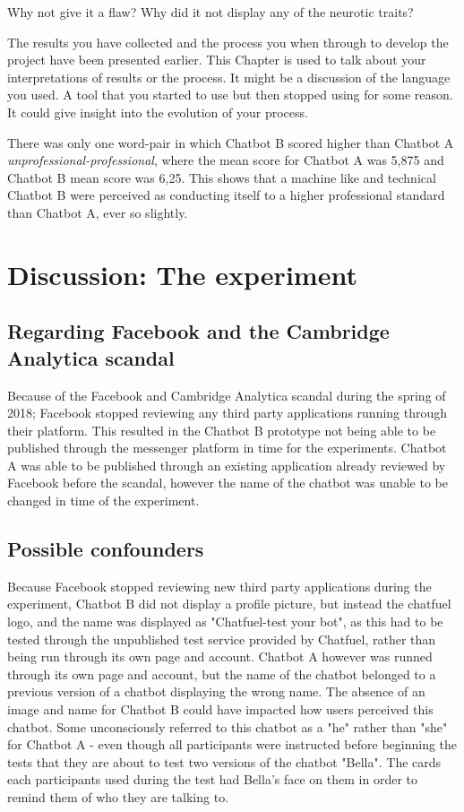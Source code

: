 Why not give it a flaw? Why did it not display any of the neurotic traits?

The results you have collected and the process you when through to develop the project have been presented earlier.  This Chapter is used to talk about your interpretations of results or the process.  It might be a discussion of the language you used.  A tool that you started to use but then stopped using for some reason.  It could give insight into the evolution of your process.

There was only one word-pair in which Chatbot B scored higher than Chatbot A \textit{unprofessional-professional}, where the mean score for Chatbot A was 5,875 and Chatbot B mean score was 6,25. This shows that a machine like and technical Chatbot B were perceived as conducting itself to a higher professional standard than Chatbot A, ever so slightly.

\section{Discussion: The experiment}

\subsection{Regarding Facebook and the Cambridge Analytica scandal}

Because of the Facebook and Cambridge Analytica scandal during the spring of 2018; Facebook stopped reviewing any third party applications running through their platform. This resulted in the Chatbot B prototype not being able to be published through the messenger platform in time for the experiments. Chatbot A was able to be published through an existing application already reviewed by Facebook before the scandal, however the name of the chatbot was unable to be changed in time of the experiment.

\subsection{Possible confounders}
Because Facebook stopped reviewing new third party applications during the experiment, Chatbot B did not display a profile picture, but instead the chatfuel logo, and the name was displayed as "Chatfuel-test your bot", as this had to be tested through the unpublished test service provided by Chatfuel, rather than being run through its own page and account. Chatbot A however was runned through its own page and account, but the name of the chatbot belonged to a previous version of a chatbot displaying the wrong name. The absence of an image and name for Chatbot B could have impacted how users perceived this chatbot. Some unconsciously referred to this chatbot as a "he" rather than "she" for Chatbot A - even though all participants were instructed before beginning the tests that they are about to test two versions of the chatbot "Bella". The cards each participants used during the test had Bella's face on them in order to remind them of who they are talking to. 

